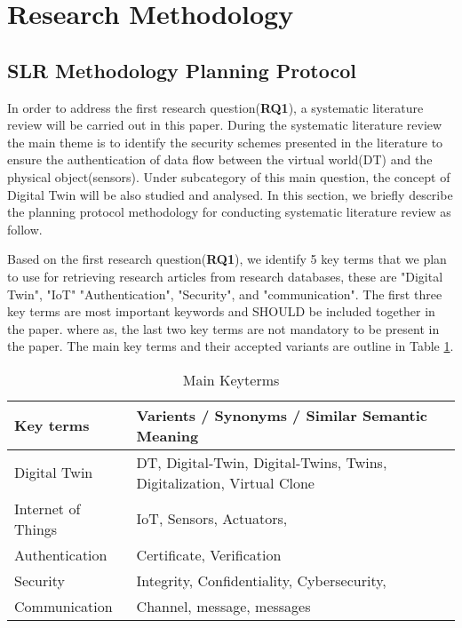 \section{Research Methodology}

\subsection{SLR Methodology Planning Protocol}
In order to address the first research question(\textbf{RQ1}), a systematic literature review will be carried out in this paper. During the systematic literature review the main theme is to identify the security schemes presented in the literature to ensure the authentication of data flow between the virtual world(DT) and the physical object(sensors). Under subcategory of this main question, the concept of Digital Twin will be also studied and analysed. In this section, we briefly describe the planning protocol methodology for conducting systematic literature review as follow. 

Based on the first research question(\textbf{RQ1}), we identify 5 key terms that we plan to use for retrieving research articles from research databases, these are "Digital Twin", "IoT" "Authentication", "Security", and "communication". The first three key terms are most important keywords and SHOULD be included together in the paper. where as, the last two key terms are not mandatory to be present in the paper. The main key terms and their accepted variants are outline in Table \ref{keyterms}. 

\begin{table}[!ht]
    \centering
    \begin{tabular}{|l|l|}
    \hline
        \textbf{Key terms} & \textbf{Varients / Synonyms / Similar Semantic Meaning} \\ \hline
        Digital Twin & DT, Digital-Twin, Digital-Twins, Twins, Digitalization, Virtual Clone \\ \hline
        Internet of Things & IoT, Sensors, Actuators,  \\ \hline
        Authentication & Certificate, Verification\\ \hline
        Security & Integrity, Confidentiality, Cybersecurity,  \\ \hline
        Communication & Channel, message, messages \\ \hline
    \end{tabular}
    \caption{Main Keyterms }
    \label{keyterms}
\end{table}

